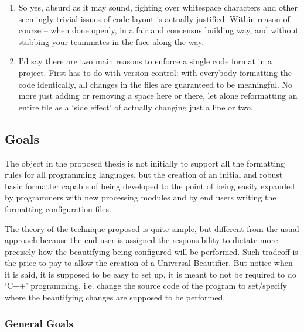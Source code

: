 \begin{englishtext}
\begin{enumerate}[leftmargin=*]
        \item
        \begin{citacao}
        So yes, absurd as it may sound, fighting over whitespace characters and other seemingly
        trivial issues of code layout is actually justified. Within reason of course -- when done
        openly, in a fair and concensus building way, and without stabbing your teammates in the
        face along the way. \cite{Atwood}
        \end{citacao}

        \item
        \begin{citacao}
        I'd say there are two main reasons to enforce a single code format in a project. First has
        to do with version control: with everybody formatting the code identically, all changes in
        the files are guaranteed to be meaningful. No more just adding or removing a space here or
        there, let alone reformatting an entire file as a `side effect' of actually changing just a
        line or two. \cite{Geukens}
        \end{citacao}

    \end{enumerate}



\subsection{Goals}

    The object in the proposed thesis is not initially to support all the
    formatting rules for all programming languages, but the creation of an
    initial and robust basic formatter capable of being developed to the point
    of being easily expanded by programmers with new processing modules and by
    end users writing the formatting configuration files.

    The theory of the technique proposed is quite simple, but different from the
    usual approach because the end user is assigned the responsibility to
    dictate more precisely how the beautifying being configured will be
    performed. Such tradeoff is the price to pay to allow the creation of a
    Universal Beautifier. But notice when it is said, it is supposed to be easy
    to set up, it is meant to not be required to do `C++' programming, i.e.
    change the source code of the program to set/specify where the beautifying
    changes are supposed to be performed.


\subsubsection{General Goals}


\end{englishtext}
